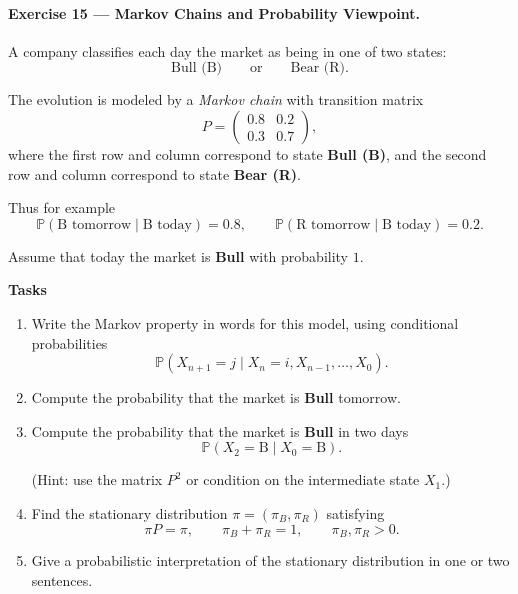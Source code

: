 \documentclass[11pt]{article}
\begin{document}
\paragraph{Exercise 15 — Markov Chains and Probability Viewpoint.}

A company classifies each day the market as being in one of two states:
\[
\text{Bull (B)} \qquad \text{or} \qquad \text{Bear (R)}.
\]

The evolution is modeled by a \emph{Markov chain} with transition matrix
\[
P =
\begin{pmatrix}
0.8 & 0.2 \\
0.3 & 0.7
\end{pmatrix},
\]
where the first row and column correspond to state \textbf{Bull (B)}, and the second row and column correspond to state \textbf{Bear (R)}.

Thus for example
\[
\mathbb{P}(\text{B tomorrow}\mid \text{B today}) = 0.8,
\qquad
\mathbb{P}(\text{R tomorrow}\mid \text{B today}) = 0.2.
\]

Assume that today the market is \textbf{Bull} with probability $1$.

\bigskip

\noindent
\textbf{Tasks}

\begin{enumerate}
    \item Write the Markov property in words for this model, using conditional probabilities
    \[
    \mathbb{P}(X_{n+1} = j \mid X_n = i, X_{n-1},\dots,X_0).
    \]

    \item Compute the probability that the market is \textbf{Bull} tomorrow.

    \item Compute the probability that the market is \textbf{Bull} in two days
    \[
    \mathbb{P}(X_2 = \text{B} \mid X_0=\text{B}).
    \]

    (Hint: use the matrix $P^2$ or condition on the intermediate state $X_1$.)

    \item Find the stationary distribution $\pi=(\pi_B,\pi_R)$ satisfying
    \[
    \pi P = \pi,
    \qquad
    \pi_B+\pi_R=1,
    \qquad
    \pi_B,\pi_R>0.
    \]

    \item Give a probabilistic interpretation of the stationary distribution in one or two sentences.
\end{enumerate}

\end{document}
